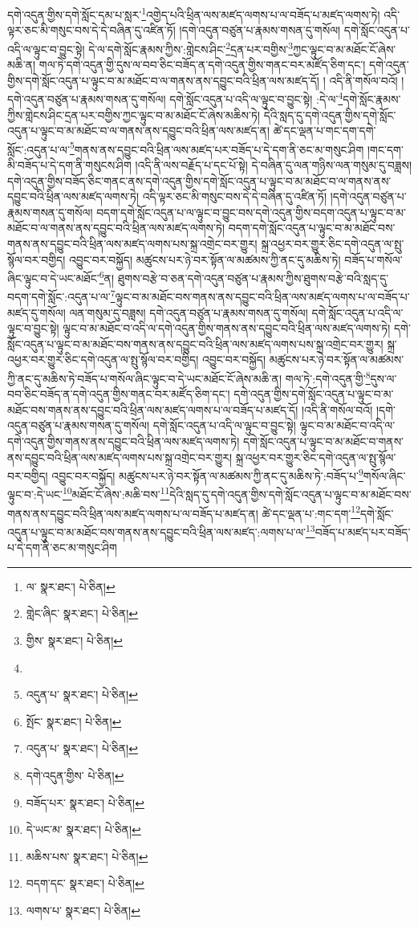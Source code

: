 དགེ་འདུན་གྱིས་དགེ་སློང་དམ་པ་སླར་\footnote{ལ་  སྣར་ཐང་།  པེ་ཅིན། }འགྱེད་པའི་ཕྲིན་ལས་མཛད་ལགས་པ་ལ་བཟོད་པ་མཛད་ལགས་ཏེ། འདི་ལྟར་ཅང་མི་གསུང་བས་དེ་དེ་བཞིན་དུ་འཛིན་ཏོ། །དགེ་འདུན་བཙུན་པ་རྣམས་གསན་དུ་གསོལ། དགེ་སློང་འདུན་པ་འདི་ལ་ལྟུང་བ་བྱུང་སྟེ། དེ་ལ་དགེ་སློང་རྣམས་ཀྱིས་:གླེངས་ཤིང་\footnote{གླེང་ཞིང་  སྣར་ཐང་།  པེ་ཅིན། }དྲན་པར་བགྱིས་\footnote{གྱིས་  སྣར་ཐང་།  པེ་ཅིན། }ཀྱང་ལྟུང་བ་མ་མཐོང་ངོ་ཞེས་མཆི་ན། གལ་ཏེ་དགེ་འདུན་གྱི་དུས་ལ་བབ་ཅིང་བཟོད་ན་དགེ་འདུན་གྱིས་གནང་བར་མཛོད་ཅིག་དང་། དགེ་འདུན་གྱིས་དགེ་སློང་འདུན་པ་ལྟུང་བ་མ་མཐོང་བ་ལ་གནས་ནས་དབྱུང་བའི་ཕྲིན་ལས་མཛད་དོ། །
འདི་ནི་གསོལ་བའོ། །དགེ་འདུན་བཙུན་པ་རྣམས་གསན་དུ་གསོལ། དགེ་སློང་འདུན་པ་འདི་ལ་ལྟུང་བ་བྱུང་སྟེ། :དེ་ལ་\footnote{}དགེ་སློང་རྣམས་ཀྱིས་གླེངས་ཤིང་དྲན་པར་བགྱིས་ཀྱང་ལྟུང་བ་མ་མཐོང་ངོ་ཞེས་མཆིས་ཏེ། དེའི་སླད་དུ་དགེ་འདུན་གྱིས་དགེ་སློང་འདུན་པ་ལྟུང་བ་མ་མཐོང་བ་ལ་གནས་ནས་དབྱུང་བའི་ཕྲིན་ལས་མཛད་ན། ཚེ་དང་ལྡན་པ་གང་དག་དགེ་སློང་:འདུན་པ་ལ་\footnote{འདུན་པ་  སྣར་ཐང་།  པེ་ཅིན། }གནས་ནས་དབྱུང་བའི་ཕྲིན་ལས་མཛད་པར་བཟོད་པ་དེ་དག་ནི་ཅང་མ་གསུང་ཤིག །གང་དག་མི་བཟོད་པ་དེ་དག་ནི་གསུངས་ཤིག །འདི་ནི་ལས་བརྗོད་པ་དང་པོ་སྟེ། དེ་བཞིན་དུ་ལན་གཉིས་ལན་གསུམ་དུ་བཟླས། དགེ་འདུན་གྱིས་བཟོད་ཅིང་གནང་ནས་དགེ་འདུན་གྱིས་དགེ་སློང་འདུན་པ་ལྟུང་བ་མ་མཐོང་བ་ལ་གནས་ནས་དབྱུང་བའི་ཕྲིན་ལས་མཛད་ལགས་ཏེ། འདི་ལྟར་ཅང་མི་གསུང་བས་དེ་དེ་བཞིན་དུ་འཛིན་ཏོ། །དགེ་འདུན་བཙུན་པ་རྣམས་གསན་དུ་གསོལ། བདག་དགེ་སློང་འདུན་པ་ལ་ལྟུང་བ་བྱུང་བས་དགེ་འདུན་གྱིས་བདག་འདུན་པ་ལྟུང་བ་མ་མཐོང་བ་ལ་གནས་ནས་དབྱུང་བའི་ཕྲིན་ལས་མཛད་ལགས་ཏེ། བདག་དགེ་སློང་འདུན་པ་ལྟུང་བ་མ་མཐོང་བས་གནས་ནས་དབྱུང་བའི་ཕྲིན་ལས་མཛད་ལགས་པས་སྐྲ་འགྲེང་བར་གྱུར། སྐྲ་འཕྱར་བར་གྱུར་ཅིང་དགེ་འདུན་ལ་སྤུ་སྙོལ་བར་བགྱིད། འབྱུང་བར་བསྐྱོད། མཚུངས་པར་ཉེ་བར་སྟོན་ལ་མཚམས་ཀྱི་ནང་དུ་མཆིས་ཏེ། བཟོད་པ་གསོལ་ཞིང་ལྟུང་བ་དེ་ཡང་མཐོང་\footnote{སྤོང་  སྣར་ཐང་།  པེ་ཅིན། }ན། ཐུགས་བརྩེ་བ་ཅན་དགེ་འདུན་བཙུན་པ་རྣམས་ཀྱིས་ཐུགས་བརྩེ་བའི་སླད་དུ་བདག་དགེ་སློང་:འདུན་པ་ལ་\footnote{འདུན་པ་  སྣར་ཐང་།  པེ་ཅིན། }ལྟུང་བ་མ་མཐོང་བས་གནས་ནས་དབྱུང་བའི་ཕྲིན་ལས་མཛད་ལགས་པ་ལ་བཟོད་པ་མཛད་དུ་གསོལ། ལན་གསུམ་དུ་བཟླས། དགེ་འདུན་བཙུན་པ་རྣམས་གསན་དུ་གསོལ། དགེ་སློང་འདུན་པ་འདི་ལ་ལྟུང་བ་བྱུང་སྟེ། ལྟུང་བ་མ་མཐོང་བ་འདི་ལ་དགེ་འདུན་གྱིས་གནས་ནས་དབྱུང་བའི་ཕྲིན་ལས་མཛད་ལགས་ཏེ། དགེ་སློང་འདུན་པ་ལྟུང་བ་མ་མཐོང་བས་གནས་ནས་དབྱུང་བའི་ཕྲིན་ལས་མཛད་ལགས་པས་སྐྲ་འགྲེང་བར་གྱུར། སྐྲ་འཕྱར་བར་གྱུར་ཅིང་དགེ་འདུན་ལ་སྤུ་སྙོལ་བར་བགྱིད། འབྱུང་བར་བསྐྱོད། མཚུངས་པར་ཉེ་བར་སྟོན་ལ་མཚམས་ཀྱི་ནང་དུ་མཆིས་ཏེ་བཟོད་པ་གསོལ་ཞིང་ལྟུང་བ་དེ་ཡང་མཐོང་ངོ་ཞེས་མཆི་ན། གལ་ཏེ་:དགེ་འདུན་གྱི་\footnote{དགེ་འདུན་གྱིས་  པེ་ཅིན། }དུས་ལ་བབ་ཅིང་བཟོད་ན་དགེ་འདུན་གྱིས་གནང་བར་མཛོད་ཅིག་དང་། དགེ་འདུན་གྱིས་དགེ་སློང་འདུན་པ་ལྟུང་བ་མ་མཐོང་བས་གནས་ནས་དབྱུང་བའི་ཕྲིན་ལས་མཛད་ལགས་པ་ལ་བཟོད་པ་མཛད་དོ། །འདི་ནི་གསོལ་བའོ། །དགེ་འདུན་བཙུན་པ་རྣམས་གསན་དུ་གསོལ། དགེ་སློང་འདུན་པ་འདི་ལ་ལྟུང་བ་བྱུང་སྟེ། ལྟུང་བ་མ་མཐོང་བ་འདི་ལ་དགེ་འདུན་གྱིས་གནས་ནས་དབྱུང་བའི་ཕྲིན་ལས་མཛད་ལགས་ཏེ། དགེ་སློང་འདུན་པ་ལྟུང་བ་མ་མཐོང་བ་གནས་ནས་དབྱུང་བའི་ཕྲིན་ལས་མཛད་ལགས་པས་སྐྲ་འགྲེང་བར་གྱུར། སྐྲ་འཕྱར་བར་གྱུར་ཅིང་དགེ་འདུན་ལ་སྤུ་སྙོལ་བར་བགྱིད། འབྱུང་བར་བསྐྱོད། མཚུངས་པར་ཉེ་བར་སྟོན་ལ་མཚམས་ཀྱི་ནང་དུ་མཆིས་ཏེ་:བཟོད་པ་\footnote{བཟོད་པར་  སྣར་ཐང་།  པེ་ཅིན། }གསོལ་ཞིང་ལྟུང་བ་:དེ་ཡང་\footnote{དེ་ཡང་མ་  སྣར་ཐང་།  པེ་ཅིན། }མཐོང་ངོ་ཞེས་:མཆི་བས་\footnote{མཆིས་པས་  སྣར་ཐང་།  པེ་ཅིན། }དེའི་སླད་དུ་དགེ་འདུན་གྱིས་དགེ་སློང་འདུན་པ་ལྟུང་བ་མ་མཐོང་བས་གནས་ནས་དབྱུང་བའི་ཕྲིན་ལས་མཛད་ལགས་པ་ལ་བཟོད་པ་མཛད་ན། ཚེ་དང་ལྡན་པ་:གང་དག་\footnote{བདག་དང་  སྣར་ཐང་།  པེ་ཅིན། }དགེ་སློང་འདུན་པ་ལྟུང་བ་མ་མཐོང་བས་གནས་ནས་དབྱུང་བའི་ཕྲིན་ལས་མཛད་:ལགས་པ་ལ་\footnote{ལགས་པ་  སྣར་ཐང་།  པེ་ཅིན། }བཟོད་པ་མཛད་པར་བཟོད་པ་དེ་དག་ནི་ཅང་མ་གསུང་ཤིག 